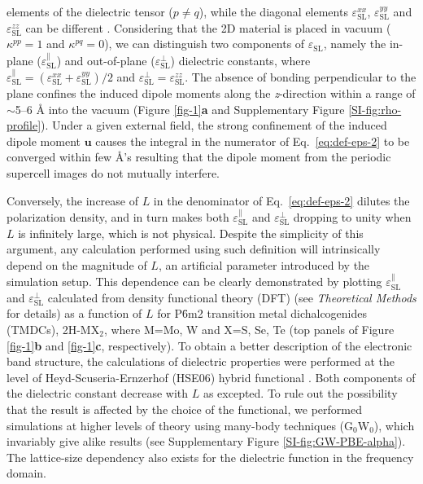 \documentclass[journal=ancac3,manuscript=article,email=true,hyperref=true,keywords=false]{achemso}
\begin{document}
elements of the dielectric tensor ($p \neq q$), while the diagonal
elements $\varepsilon_{\mathrm{SL}}^{xx}$,
$\varepsilon_{\mathrm{SL}}^{yy}$ and $\varepsilon_{\mathrm{SL}}^{zz}$
can be different \cite{Sohier_2016}.  
%
Considering that the 2D material
is placed in vacuum ($\kappa^{pp} = 1$ and $\kappa^{pq} = 0$), we can
distinguish two components of $\varepsilon_{\mathrm{SL}}$, namely the
in-plane ($\varepsilon_{\mathrm{SL}}^{\parallel}$) and out-of-plane
($\varepsilon_{\mathrm{SL}}^{\perp}$) dielectric constants, where
$\varepsilon_{\mathrm{SL}}^{\parallel} =
(\varepsilon_{\mathrm{SL}}^{xx} + \varepsilon_{\mathrm{SL}}^{yy})/2$
and
$\varepsilon_{\mathrm{SL}}^{\perp} = \varepsilon_{\mathrm{SL}}^{zz}$.
The absence of bonding perpendicular to the plane confines the induced
dipole moments along the \textit{z}-direction within a range of $\sim$5--6
\AA{} into the vacuum (Figure \ref{fig-1}{\textbf a} and Supplementary
Figure \ref{SI-fig:rho-profile}).
%
%
Under a given external field, the strong confinement of
the induced dipole moment $\boldsymbol{u}$ causes the integral in the 
numerator of Eq.~\ref{eq:def-eps-2} to be converged within few \AA's 
resulting that the dipole moment from the periodic supercell 
images do not mutually interfere. 
%


Conversely, the increase of
$L$ in the denominator of Eq.~\ref{eq:def-eps-2} dilutes the 
polarization density, and in turn makes both
$\varepsilon^{\parallel}_{\mathrm{SL}}$ and
$\varepsilon^{\perp}_{\mathrm{SL}}$ dropping to
unity when $L$ is infinitely large, which is not physical. 
%
%
%
Despite the simplicity of this argument, any calculation performed
using such definition will intrinsically depend on the magnitude of
$L$, an artificial parameter introduced by the simulation setup. This
dependence can be clearly demonstrated by plotting
$\varepsilon^{\parallel}_{\mathrm{SL}}$ and
$\varepsilon^{\perp}_{\mathrm{SL}}$ calculated from density functional
theory (DFT) (see {\it Theoretical Methods} for details) as a function
of $L$ for P\={6}m2 transition metal dichalcogenides (TMDCs),
2H-MX$_{2}$, where M=Mo, W and X=S, Se, Te (top panels of Figure
\ref{fig-1}{\textbf b} and \ref{fig-1}{\textbf c}, respectively). To
obtain a better description of the electronic band structure, the
calculations of dielectric properties were performed at the level of
Heyd-Scuseria-Ernzerhof (HSE06) hybrid functional
\cite{Heyd_2003,HSE_2006}.  Both components of the dielectric
constant decrease with $L$ as excepted. To rule out the possibility
that the result is affected by the choice of the functional, 
we performed simulations at higher levels of theory
using many-body techniques (G$_{0}$W$_{0}$), which invariably give
alike results (see Supplementary Figure \ref{SI-fig:GW-PBE-alpha}).
The lattice-size dependency also exists for the dielectric function in the 
frequency domain. 
\end{document}
